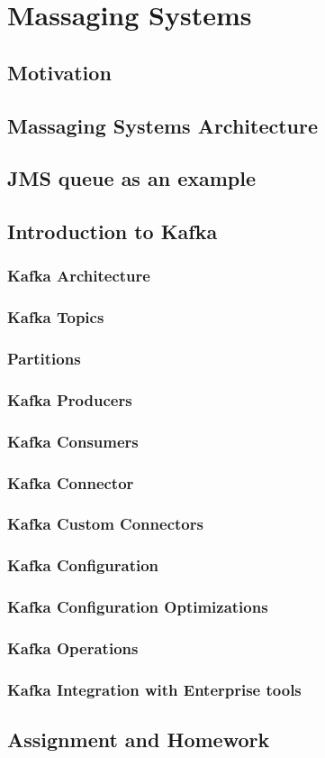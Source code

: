 \section{Massaging Systems}
\subsection{Motivation}
\subsection{Massaging Systems Architecture}
\subsection{JMS queue as an example}
\subsection{Introduction to Kafka}
\subsubsection{Kafka Architecture}
\subsubsection{Kafka Topics}
\subsubsection{Partitions}
\subsubsection{Kafka Producers}
\subsubsection{Kafka Consumers}
\subsubsection{Kafka Connector}
\subsubsection{Kafka Custom Connectors}
\subsubsection{Kafka Configuration}
\subsubsection{Kafka Configuration Optimizations}
\subsubsection{Kafka Operations}
\subsubsection{Kafka Integration with Enterprise tools}
\subsection{Assignment and Homework}